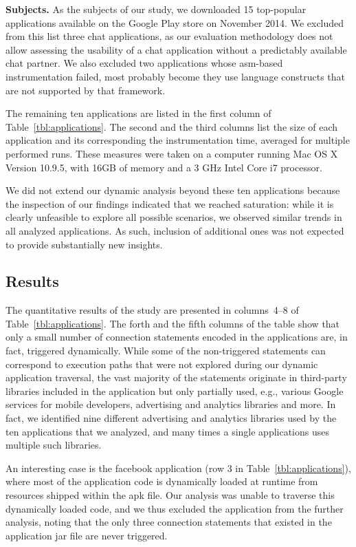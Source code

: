\vspace{0.1in}
\noindent 
{\bf Subjects.} 
As the subjects of our study, we downloaded 15 top-popular applications available on the Google Play store on November 2014. 
We excluded from this list three chat applications, as our evaluation methodology does not allow assessing the usability of a chat application without a predictably available chat partner. 
We also excluded two applications whose asm-based instrumentation failed, most probably become they use language constructs that are not supported by that framework.

The remaining ten applications are listed in the first column of Table~\ref{tbl:applications}.
The second and the third columns list the size of each application and its corresponding the instrumentation time, averaged for multiple performed runs. These measures were taken on a computer running Mac OS X Version 10.9.5, with 16GB of memory and a 3 GHz Intel Core i7 processor.  

We did not extend our dynamic analysis beyond these ten applications because the inspection of our findings indicated that we reached saturation: while it is clearly unfeasible to explore all possible scenarios, we observed similar trends in all analyzed applications. As such, inclusion of additional ones was not expected to provide substantially new insights. 

\subsection{Results}
The quantitative results of the study are presented in columns~4--8 of Table~\ref{tbl:applications}. 
The forth and the fifth columns of the table show that only a small number of connection statements encoded in the applications are, in fact, triggered dynamically. 
While some of the non-triggered statements can correspond to execution paths that were not explored during our dynamic application traversal, the vast majority of the statements originate in  
third-party libraries included in the application but only partially used, e.g., various Google services for mobile developers, advertising and analytics libraries and more.
In fact, we identified nine different advertising and analytics libraries used by the ten applications that we analyzed, 
and many times a single applications uses multiple such libraries.

An interesting case is the facebook application (row 3 in Table~\ref{tbl:applications}), where most of the application code is dynamically loaded at runtime from resources shipped within the apk file. 
Our analysis was unable to traverse this dynamically loaded code, and we thus excluded the application from the further analysis, noting that the only three connection statements that existed in the application jar file are never triggered. 

